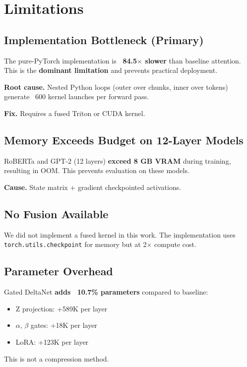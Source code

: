 
\section{Limitations}

\subsection{Implementation Bottleneck (Primary)}

The pure-PyTorch implementation is \textbf{~84.5$\times$ slower} than baseline 
attention. This is the \textbf{dominant limitation} and prevents practical 
deployment.

\textbf{Root cause.} Nested Python loops (outer over chunks, inner over tokens) 
generate ~600 kernel launches per forward pass.

\textbf{Fix.} Requires a fused Triton or CUDA kernel.

\subsection{Memory Exceeds Budget on 12-Layer Models}

RoBERTa and GPT-2 (12 layers) \textbf{exceed 8 GB VRAM} during training, 
resulting in OOM. This prevents evaluation on these models.

\textbf{Cause.} State matrix + gradient checkpointed activations.

\subsection{No Fusion Available}

We did not implement a fused kernel in this work. The implementation uses 
\texttt{torch.utils.checkpoint} for memory but at 2$\times$ compute cost.

\subsection{Parameter Overhead}

Gated DeltaNet \textbf{adds ~10.7\% parameters} compared to baseline:
\begin{itemize}
\item Z projection: +589K per layer
\item $\alpha$, $\beta$ gates: +18K per layer
\item LoRA: +123K per layer

\end{itemize}
This is not a compression method.

